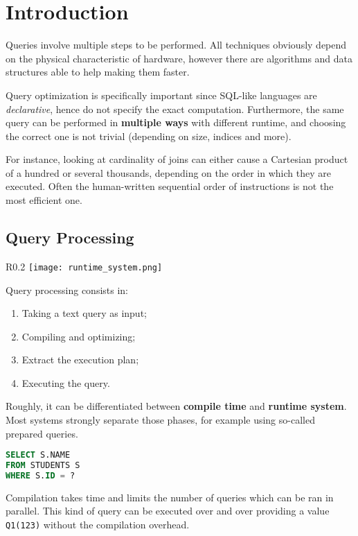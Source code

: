 
\section{Introduction}
Queries involve multiple steps to be performed. All techniques obviously depend on the physical characteristic of hardware, however there are algorithms and data structures able to help making them faster.

Query optimization is specifically important since SQL-like languages are \textit{declarative}, hence do not specify the exact computation. Furthermore, the same query can be performed in \textbf{multiple ways} with different runtime, and choosing the correct one is not trivial (depending on size, indices and more).

For instance, looking at cardinality of joins can either cause a Cartesian product of a hundred or several thousands, depending on the order in which they are executed. Often the human-written sequential order of instructions is not the most efficient one.

\subsection{Query Processing}
\begin{wrapfigure}{R}{0.2\textwidth}
	\vspace{-35pt}
	\texttt{[image: runtime\_system.png]}
	\vspace{-100pt}
\end{wrapfigure}
Query processing consists in: 
\begin{enumerate}
	\item Taking a text query as input;
	\item Compiling and optimizing;
	\item Extract the execution plan;
	\item Executing the query.
\end{enumerate}
Roughly, it can be differentiated between \textbf{compile time} and \textbf{runtime system}. Most systems strongly separate those phases, for example using so-called prepared queries.
\begin{lstlisting}[language=SQL]
SELECT S.NAME
FROM STUDENTS S
WHERE S.ID = ?
\end{lstlisting}

Compilation takes time and limits the number of queries which can be ran in parallel. This kind of query can be executed over and over providing a value \texttt{Q1(123)} without the compilation overhead.

